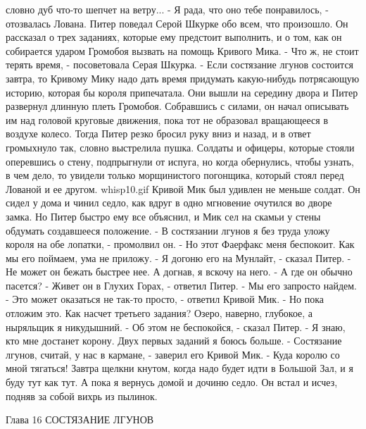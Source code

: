 словно дуб что-то шепчет на ветру...
    - Я рада, что оно тебе понравилось, - отозвалась Лована.
    Питер поведал Серой Шкурке обо всем, что произошло. Он рассказал о 
трех заданиях, которые ему предстоит выполнить, и о том, как он 
собирается ударом Громобоя вызвать на помощь Кривого Мика.
    - Что ж, не стоит терять время, - посоветовала Серая Шкурка. - 
Если состязание лгунов состоится завтра, то Кривому Мику надо дать 
время придумать какую-нибудь потрясающую историю, которая бы короля 
припечатала.
    Они вышли на середину двора и Питер развернул длинную плеть 
Громобоя. Собравшись с силами, он начал описывать им над головой 
круговые движения, пока тот не образовал вращающееся в воздухе колесо. 
Тогда Питер резко бросил руку вниз и назад, и в ответ громыхнуло так, 
словно выстрелила пушка. Солдаты и офицеры, которые стояли оперевшись 
о стену, подпрыгнули от испуга, но когда обернулись, чтобы узнать, в 
чем дело, то увидели только морщинистого погонщика, который стоял 
перед Лованой и ее другом.
    {whisp10.gif}
    Кривой Мик был удивлен не меньше солдат. Он сидел у дома и чинил 
седло, как вдруг в одно мгновение очутился во дворе замка. Но Питер 
быстро ему все объяснил, и Мик сел на скамьи у стены обдумать 
создавшееся положение.
    - В состязании лгунов я без труда уложу короля на обе лопатки, - 
промолвил он. - Но этот Фаерфакс меня беспокоит. Как мы его поймаем, 
ума не приложу.
    - Я догоню его на Мунлайт, - сказал Питер. - Не может он бежать 
быстрее нее. А догнав, я вскочу на него.
    - А где он обычно пасется?
    - Живет он в Глухих Горах, - ответил Питер. - Мы его запросто 
найдем.
    - Это может оказаться не так-то просто, - ответил Кривой Мик. - Но 
пока отложим это. Как насчет третьего задания? Озеро, наверно, 
глубокое, а ныряльщик я никудышний.
    - Об этом не беспокойся, - сказал Питер. - Я знаю, кто мне 
достанет корону. Двух первых заданий я боюсь больше.
    - Состязание лгунов, считай, у нас в кармане, - заверил его Кривой 
Мик. - Куда королю со мной тягаться! Завтра щелкни кнутом, когда надо 
будет идти в Большой Зал, и я буду тут как тут. А пока я вернусь домой 
и дочиню седло.
    Он встал и исчез, подняв за собой вихрь из пылинок.

        Глава 16
        СОСТЯЗАНИЕ ЛГУНОВ

